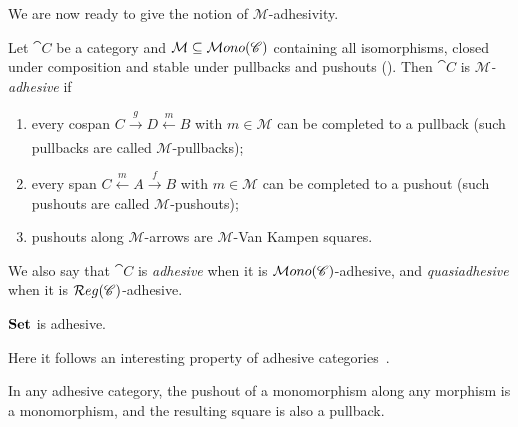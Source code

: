 We are now ready to give the notion of $\mathcal M$-adhesivity. %

\begin{definition}\label{def:adh}
    Let $\cat C$ be a category and $\mathcal M \subseteq \mathcal{M}ono(\mathscr{C})$ containing all isomorphisms, closed under composition and stable under pullbacks and pushouts ().
    Then $\cat C$ is \emph{$\mathcal M$-adhesive} if
    \begin{enumerate}
        \item every cospan $C \xrightarrow[]{g} D \xleftarrow[]{m} B$ with $m \in \mathcal M$ can be completed to a pullback (such pullbacks are called $\mathcal M$-pullbacks);
        \item every span $C \xleftarrow{m} A \xrightarrow{f} B$ with $ m \in \mathcal M$ can be completed to a pushout (such pushouts are called $\mathcal M$-pushouts);
        \item pushouts along $\mathcal M$-arrows are $\mathcal M$-Van Kampen squares.
    \end{enumerate}
    We also say that $\cat C$ is \emph{adhesive} when it is $\mathcal{M}ono(\mathscr{C})$-adhesive, and \emph{quasiadhesive} when it is $\mathcal{R}eg(\mathscr{C})$-adhesive. 
\end{definition}

\begin{obs}
    $\mathbf{Set}$ is adhesive.
\end{obs}

Here it follows an interesting property of adhesive categories~\cite{lack2011embeddingtheoremadhesivecategories}.

\begin{prop}\label{prop:monos_are_preserved_by_pullbacks_in_adh_cats}
    In any adhesive category, the pushout of a monomorphism along any morphism is a monomorphism, and the resulting square is also a pullback. 
\end{prop}

